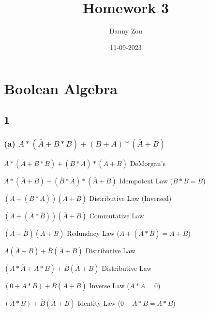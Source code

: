\documentclass{article}
\title{Homework 3}
\date{11-09-2023}
\author{Danny Zou}
\begin{document}
    \maketitle
    \onehalfspacing

    \section*{Boolean Algebra}

    \subsection*{1}

    \subsubsection*{(a) $A * (\overline{A} + B * B) + \overline{(B+A)} * (\overline{A} + B)$} 
    
    $A * (\overline{A} + B * B) + (\overline{B} * \overline{A}) * (\overline{A} + B)$ \hspace*{0.1in} DeMorgan's 

    $A * (\overline{A} + B) + (\overline{B} * \overline{A}) * (\overline{A} + B)$ \hspace*{0.1in} Idempotent Law ($B * B = B$)

    $(A + (\overline{B} * \overline{A}))(\overline{A} + B)$ \hspace*{0.1in} Distributive Law (Inversed)

    $(A + (\overline{A} * \overline{B}))(\overline{A} + B)$ \hspace*{0.1in} Commutative Law
    
    $(A + \overline{B})(\overline{A} + B)$ \hspace*{0.1in}  Redundacy Law ($A + (\overline{A} * \overline{B}) = A + \overline{B}$)

    $A(\overline{A} + B) + \overline{B}(\overline{A} + B)$ \hspace*{0.1in} Distributive Law

    $(A * \overline{A} + A * B) + \overline{B}(\overline{A} + B)$ \hspace*{0.1in} Distributive Law

    $(0 + A * B) + \overline{B}(\overline{A} + B)$ \hspace*{0.1in} Inverse Law ($A * \overline{A} = 0$)

    $(A * B) + \overline{B}(\overline{A} + B)$ \hspace*{0.1in} Identity Law ($0+A*B = A*B$)
\end{document}
